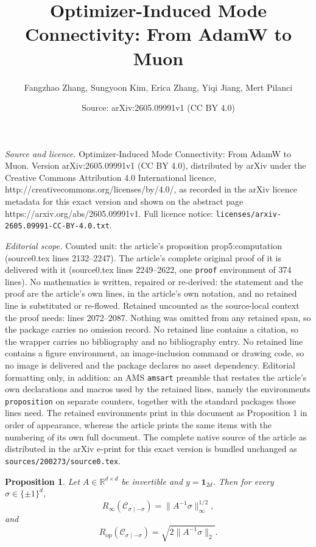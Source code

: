 \documentclass[10pt,a4paper]{amsart}
\title{Optimizer-Induced Mode Connectivity: From AdamW to Muon}
\author{Fangzhao Zhang, Sungyoon Kim, Erica Zhang, Yiqi Jiang, Mert Pilanci}
\date{Source: arXiv:2605.09991v1 (CC BY 4.0)}
\newtheorem{proposition}{Proposition}
\begin{document}
\maketitle

\noindent\emph{Source and licence.} Optimizer-Induced Mode Connectivity: From AdamW to Muon. Version arXiv:2605.09991v1 (CC BY 4.0), distributed by arXiv under the Creative Commons Attribution 4.0 International licence, http://creativecommons.org/licenses/by/4.0/, as recorded in the arXiv licence metadata for this exact version and shown on the abstract page https://arxiv.org/abs/2605.09991v1. Full licence notice: \texttt{licenses/arxiv-2605.09991-CC-BY-4.0.txt}.\par\smallskip

\noindent\textit{Editorial scope.} Counted unit: the article's proposition prop5:computation (source0.tex lines 2132--2247). The article's complete original proof of it is delivered with it (source0.tex lines 2249--2622, one \texttt{proof} environment of 374 lines). No mathematics is written, repaired or re-derived: the statement and the proof are the article's own lines, in the article's own notation, and no retained line is substituted or re-flowed.  Retained uncounted as the source-local context the proof needs: lines 2072--2087.  Nothing was omitted from any retained span, so the package carries no omission record.  No retained line contains a citation, so the wrapper carries no bibliography and no bibliography entry.  No retained line contains a figure environment, an image-inclusion command or drawing code, so no image is delivered and the package declares no asset dependency.  Editorial formatting only, in addition: an AMS \texttt{amsart} preamble that restates the article's own declarations and macros used by the retained lines, namely the environments \texttt{proposition} on separate counters, together with the standard packages those lines need.  The retained environments print in this document as Proposition 1 in order of appearance, whereas the article prints the same items with the numbering of its own full document.  The complete native source of the article as distributed in the arXiv e-print for this exact version is bundled unchanged as \texttt{sources/200273/source0.tex}.
\begin{proposition}
\label{prop4:formula_Rop_Rinf}
Let $A\in\mathbb R^{d\times d}$ be invertible and
$y=\mathbf 1_{2d}$. Then for every $\sigma\in\{\pm1\}^d$,
\[
R_\infty(\mathcal C_{\sigma\mid-\sigma})
=
\|A^{-1}\sigma\|_\infty^{1/2},
\]
and
\[
R_{\mathrm{op}}(\mathcal C_{\sigma\mid-\sigma})
=
\sqrt{2\|A^{-1}\sigma\|_2}.
\]
\end{proposition}
\end{document}
